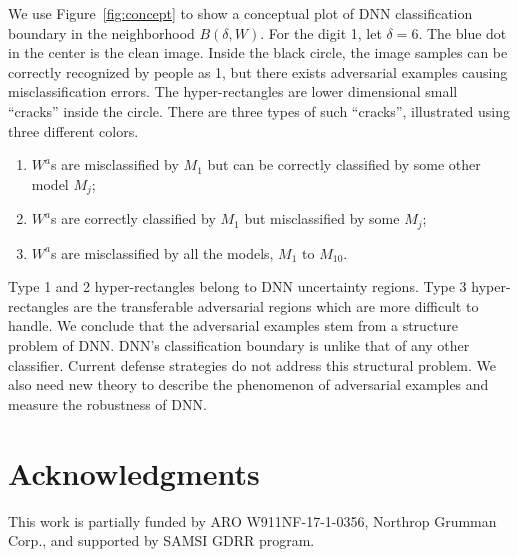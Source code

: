 \documentclass[12pt]{article}
\begin{document}
We use Figure~\ref{fig:concept} to show a
conceptual plot of DNN classification boundary in the neighborhood $B(\delta,W)$. For the
digit 1, let $\delta=6$.  The blue dot
in the center is the clean image. 
Inside the black circle, the image
samples can be correctly 
recognized by people as 1, but there exists adversarial examples causing
misclassification errors. The hyper-rectangles are lower dimensional
small ``cracks'' inside the circle.  
There are three types of such ``cracks'', illustrated
using three different colors.
%
\begin{enumerate}
\item $W^a$s are misclassified by $M_1$ but can be correctly
  classified by some other model $M_j$;
\item $W^a$s are correctly classified by $M_1$ but
  misclassified by some $M_j$;
\item $W^a$s are misclassified by all the models, $M_1$ to $M_{10}$. 
\end{enumerate}
%
Type 1 and 2 hyper-rectangles belong to DNN uncertainty regions. Type
3 hyper-rectangles are the transferable adversarial regions which are
more difficult to handle.    
We conclude that the adversarial examples stem from a
structure problem of DNN. DNN's classification boundary is unlike that of any 
other classifier. Current defense strategies  do not address this
structural problem. We also need new theory to describe the phenomenon
of adversarial examples and measure the robustness of DNN.  


%
\section*{Acknowledgments}
This work is partially funded by ARO W911NF-17-1-0356, Northrop
Grumman Corp., and supported by SAMSI GDRR program.

\end{document}

